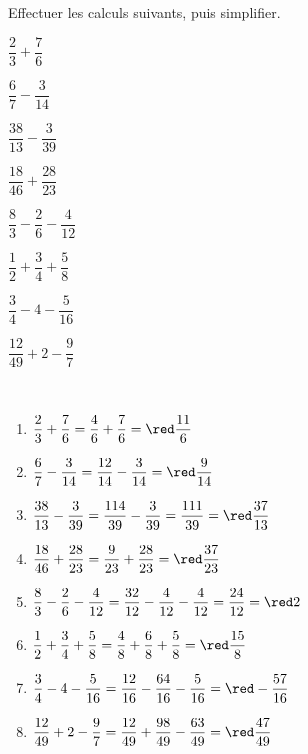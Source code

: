 \begin{exercice*}
   Effectuer les calculs suivants, puis simplifier.   
      \begin{multicols}{3}
         \begin{enumerate}
            \begin{spacing}{2}
               \item $\dfrac23+\dfrac76$
               \item $\dfrac67-\dfrac3{14}$
               \item $\dfrac{38}{13}-\dfrac3{39}$
               \item $\dfrac{18}{46}+\dfrac{28}{23}$
               \item $\dfrac83-\dfrac26-\dfrac4{12}$
               \item $\dfrac12+\dfrac34+\dfrac58$
               \item $\dfrac34-4-\dfrac5{16}$
               \item $\dfrac{12}{49}+2-\dfrac97$
            \end{spacing}
         \end{enumerate}
      \end{multicols}   
\end{exercice*}

\begin{corrige}
   \ \\ [-5mm]
   \begin{enumerate}
      \item $\dfrac23+\dfrac76 =\dfrac46+\dfrac76 =\red \dfrac{11}6$ \bigskip
      \item $\dfrac67-\dfrac3{14} =\dfrac{12}{14}-\dfrac3{14} =\red \dfrac9{14}$ \bigskip
      \item $\dfrac{38}{13}-\dfrac3{39} =\dfrac{114}{39}-\dfrac3{39} =\dfrac{111}{39} =\red \dfrac{37}{13}$ \bigskip
      \item $\dfrac{18}{46}+\dfrac{28}{23} =\dfrac{9}{23}+\dfrac{28}{23} =\red \dfrac{37}{23}$ \bigskip
      \item $\dfrac83-\dfrac26-\dfrac4{12} =\dfrac{32}{12}-\dfrac{4}{12}-\dfrac{4}{12} =\dfrac{24}{12} =\red 2$ \bigskip
      \item $\dfrac12+\dfrac34+\dfrac58 =\dfrac48+\dfrac68+\dfrac58 =\red \dfrac{15}{8}$ \bigskip
      \item $\dfrac34-4-\dfrac5{16} =\dfrac{12}{16}-\dfrac{64}{16}-\dfrac{5}{16} =\red -\dfrac{57}{16}$ \bigskip
      \item $\dfrac{12}{49}+2-\dfrac97 =\dfrac{12}{49}+\dfrac{98}{49}-\dfrac{63}{49} =\red \dfrac{47}{49}$
   \end{enumerate}
\end{corrige}